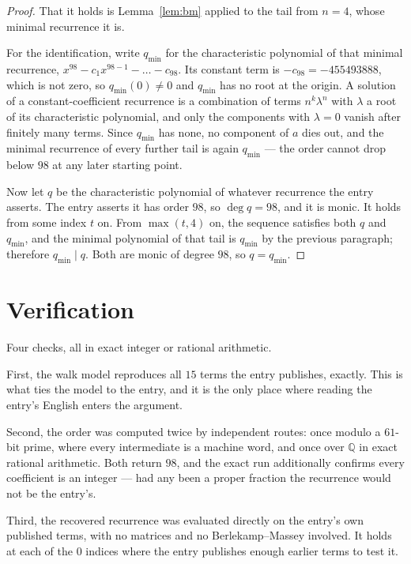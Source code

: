 \documentclass[11pt,a4paper]{article}
\theoremstyle{plain}
\theoremstyle{definition}
\begin{document}
\begin{proof}
That it holds is Lemma~\ref{lem:bm} applied to the tail from $n=4$, whose minimal
recurrence it is.

For the identification, write $q_{\min}$ for the characteristic polynomial of that minimal
recurrence, $x^{98}-c_1x^{98-1}-\dots-c_{98}$. Its constant term is
$-c_{98}=-455493888$, which is not zero, so $q_{\min}(0)\neq0$ and $q_{\min}$ has no
root at the origin. A solution of a constant-coefficient recurrence is a combination of terms
$n^{k}\lambda^{n}$ with $\lambda$ a root of its characteristic polynomial, and only the
components with $\lambda=0$ vanish after finitely many terms. Since $q_{\min}$ has none, no
component of $a$ dies out, and the minimal recurrence of every further tail is again
$q_{\min}$ --- the order cannot drop below $98$ at any later starting point.

Now let $q$ be the characteristic polynomial of whatever recurrence the entry asserts. The
entry asserts it has order $98$, so $\deg q=98$, and it is monic. It holds from some
index $t$ on. From $\max(t,4)$ on, the sequence satisfies both $q$ and $q_{\min}$, and
the minimal polynomial of that tail is $q_{\min}$ by the previous paragraph; therefore
$q_{\min}\mid q$. Both are monic of degree $98$, so $q=q_{\min}$.
\end{proof}

\section{Verification}

Four checks, all in exact integer or rational arithmetic.

First, the walk model reproduces all $15$ terms the entry publishes, exactly. This is
what ties the model to the entry, and it is the only place where reading the entry's English
enters the argument.

Second, the order was computed twice by independent routes: once modulo a $61$-bit prime, where
every intermediate is a machine word, and once over $\mathbb{Q}$ in exact rational arithmetic.
Both return $98$, and the exact run additionally confirms every coefficient is an integer
--- had any been a proper fraction the recurrence would not be the entry's.

Third, the recovered recurrence was evaluated directly on the entry's own published terms, with
no matrices and no Berlekamp--Massey involved. It holds at each of the $0$ indices where
the entry publishes enough earlier terms to test it.
\end{document}
